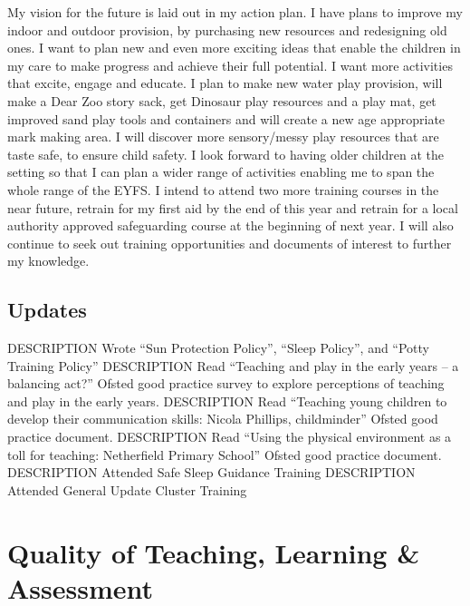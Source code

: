 \documentclass[10pt,a4paper]{report}
\makeatletter
\newcommand{\DESCRIPTION@original@item}{}
\let\DESCRIPTION@original@item\item
\newcommand*{\DESCRIPTION@envir}{DESCRIPTION}
\newlength{\DESCRIPTION@totalleftmargin}
\newlength{\DESCRIPTION@linewidth}
\newcommand{\DESCRIPTION@makelabel}[1]{\llap{#1}}%
\newcommand{\DESCRIPTION@item}[1][]{%
  \setlength{\@totalleftmargin}%
       {\DESCRIPTION@totalleftmargin+\widthof{\textbf{#1 }}-\leftmargin}%
  \setlength{\linewidth}
       {\DESCRIPTION@linewidth-\widthof{\textbf{#1 }}+\leftmargin}%
  \par\parshape \@ne \@totalleftmargin \linewidth
  \DESCRIPTION@original@item[\textbf{#1}]%
}
\newenvironment{DESCRIPTION}
  {\list{}{\setlength{\labelwidth}{0cm}%
           \let\makelabel\DESCRIPTION@makelabel}%
   \setlength{\DESCRIPTION@totalleftmargin}{\@totalleftmargin}%
   \setlength{\DESCRIPTION@linewidth}{\linewidth}%
   \renewcommand{\item}{\ifx\@currenvir\DESCRIPTION@envir
                           \expandafter\DESCRIPTION@item
                        \else
                           \expandafter\DESCRIPTION@original@item
                        \fi}}
  {\endlist}
\makeatother
\begin{document}
My vision for the future is laid out in my action plan. I have plans to improve my indoor and outdoor provision, by purchasing new resources and redesigning old ones. I want to plan new and even more exciting ideas that enable the children in my care to make progress and achieve their full potential. I want more activities that excite, engage and educate. I plan to make new water play provision, will make a Dear Zoo story sack, get Dinosaur play resources and a play mat, get improved sand play tools and containers and will create a new age appropriate mark making area. I will discover more sensory/messy play resources that are taste safe, to ensure child safety. I look forward to having older children at the setting so that I can plan a wider range of activities enabling me to span the whole range of the EYFS. I intend to attend two more training courses in the near future, retrain for my first aid by the end of this year and retrain for a local authority approved safeguarding course at the beginning of next year. I will also continue to seek out training opportunities and documents of interest to further my knowledge.

\section{Updates}

\begin{DESCRIPTION}
\item [June 2016] Wrote “Sun Protection Policy”, “Sleep Policy”, and “Potty Training Policy”
\item [June 2016] Read “Teaching and play in the early years – a balancing act?” Ofsted good practice survey to explore perceptions of teaching and play in the early years.
\item [June 2016] Read “Teaching young children to develop their communication skills: Nicola Phillips, childminder” Ofsted good practice document.
\item [June 2016] Read “Using the physical environment as a toll for teaching: Netherfield Primary School” Ofsted good practice document.
\item [June 2016] Attended Safe Sleep Guidance Training
\item [June 2016] Attended General Update Cluster Training
\end{DESCRIPTION}

\chapter{Quality of Teaching, Learning \& Assessment}
\end{document}
